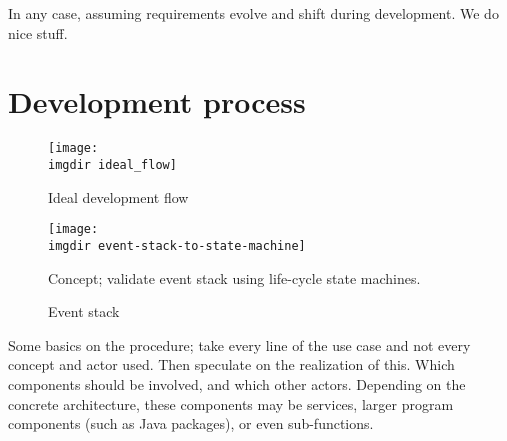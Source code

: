 In any case, assuming requirements evolve and shift during development. We do nice stuff.

\section{Development process}
\begin{figure}[ht]
\centering
\texttt{[image: \\imgdir ideal\_flow]}
\caption{Ideal development flow}
\label{fig:ideal_flow}
\end{figure}

\begin{figure}[ht]
\centering
\texttt{[image: \\imgdir event-stack-to-state-machine]}
\caption{Concept; validate event stack using life-cycle state machines.}
\label{fig:event-stack-to-state-machine}
\end{figure}

\begin{figure}[ht]
\centering
\begin{drawstack}
\end{drawstack}
\caption{Event stack}
\label{fig:event-stack-example}
\end{figure}

Some basics on the procedure; take every line of the use case and not every concept and actor used. Then speculate on the realization of this. Which components should be involved, and which other actors. Depending on the concrete architecture, these components may be services, larger program components (such as Java packages), or even sub-functions.


